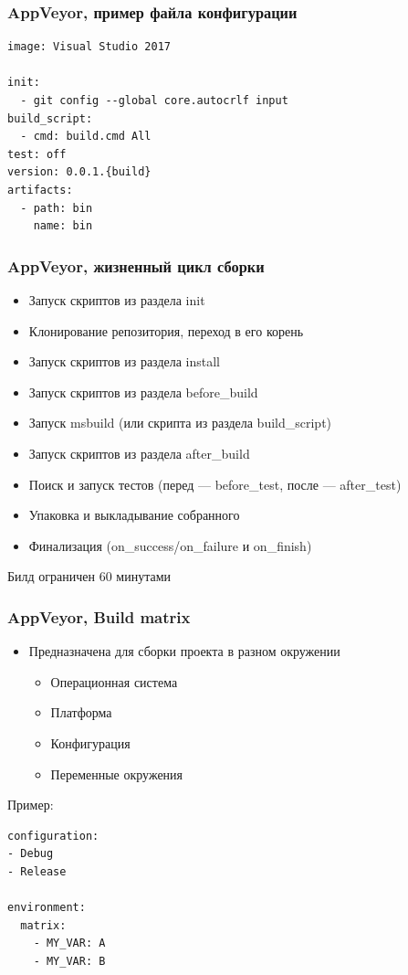 \documentclass[xetex,mathserif,serif]{beamer}
\begin{document}
	\begin{frame}[fragile]
		\frametitle{AppVeyor, пример файла конфигурации}
		\begin{verbatim}
image: Visual Studio 2017

init:
  - git config --global core.autocrlf input
build_script:
  - cmd: build.cmd All
test: off
version: 0.0.1.{build}
artifacts:
  - path: bin
    name: bin
		\end{verbatim}
	\end{frame}

	\begin{frame}
		\frametitle{AppVeyor, жизненный цикл сборки}
		\begin{itemize}
			\item Запуск скриптов из раздела init
			\item Клонирование репозитория, переход в его корень
			\item Запуск скриптов из раздела install
			\item Запуск скриптов из раздела before\_build
			\item Запуск msbuild (или скрипта из раздела build\_script)
			\item Запуск скриптов из раздела after\_build 
			\item Поиск и запуск тестов (перед --- before\_test, после --- after\_test)
			\item Упаковка и выкладывание собранного
			\item Финализация (on\_success/on\_failure и on\_finish)
		\end{itemize}
		Билд ограничен 60 минутами
	\end{frame}

	\begin{frame}[fragile]
		\frametitle{AppVeyor, Build matrix}
		\begin{itemize}
			\item Предназначена для сборки проекта в разном окружении
			\begin{itemize}
				\item Операционная система
				\item Платформа
				\item Конфигурация
				\item Переменные окружения
			\end{itemize}
		\end{itemize}
		Пример:
		\begin{verbatim}
configuration:
- Debug
- Release

environment:
  matrix:
    - MY_VAR: A
    - MY_VAR: B
		\end{verbatim}
	\end{frame}
\end{document}
